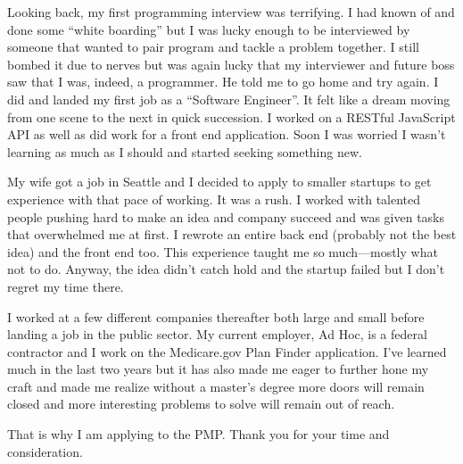 \documentclass[12pt]{article}
\begin{document}
Looking back, my first programming interview was terrifying. I had known of and done some ``white boarding'' but I was lucky enough to be interviewed by someone that wanted to pair program and tackle a problem together. I still bombed it due to nerves but was again lucky that my interviewer and future boss saw that I was, indeed, a programmer. He told me to go home and try again. I did and landed my first job as a ``Software Engineer''. It felt like a dream moving from one scene to the next in quick succession. I worked on a RESTful JavaScript API as well as did work for a front end application. Soon I was worried I wasn't learning as much as I should and started seeking something new.

My wife got a job in Seattle and I decided to apply to smaller startups to get experience with that pace of working. It was a rush. I worked with talented people pushing hard to make an idea and company succeed and was given tasks that overwhelmed me at first. I rewrote an entire back end (probably not the best idea) and the front end too. This experience taught me so much---mostly what not to do. Anyway, the idea didn't catch hold and the startup failed but I don't regret my time there.

I worked at a few different companies thereafter both large and small before landing a job in the public sector. My current employer, Ad Hoc, is a federal contractor and I work on the Medicare.gov Plan Finder application. I've learned much in the last two years but it has also made me eager to further hone my craft and made me realize without a master's degree more doors will remain closed and more interesting problems to solve will remain out of reach.

That is why I am applying to the PMP. Thank you for your time and consideration.
\end{document}
